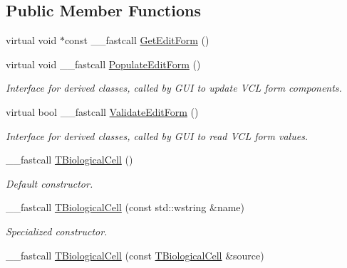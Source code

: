 \subsection*{Public Member Functions}
\begin{DoxyCompactItemize}
\item 
virtual void $\ast$const \+\_\+\+\_\+fastcall \hyperlink{class_t_biological_cell_a35a6350ccd6c518944f15902edc1c608}{Get\+Edit\+Form} ()
\item 
\hypertarget{class_t_biological_cell_a48bf395e0823aca37b48c5027cd525e2}{virtual void \+\_\+\+\_\+fastcall \hyperlink{class_t_biological_cell_a48bf395e0823aca37b48c5027cd525e2}{Populate\+Edit\+Form} ()}\label{class_t_biological_cell_a48bf395e0823aca37b48c5027cd525e2}

\begin{DoxyCompactList}\small\item\em Interface for derived classes, called by G\+U\+I to update V\+C\+L form components. \end{DoxyCompactList}\item 
\hypertarget{class_t_biological_cell_a5dcafb440645c90d2783e571dcdb06df}{virtual bool \+\_\+\+\_\+fastcall \hyperlink{class_t_biological_cell_a5dcafb440645c90d2783e571dcdb06df}{Validate\+Edit\+Form} ()}\label{class_t_biological_cell_a5dcafb440645c90d2783e571dcdb06df}

\begin{DoxyCompactList}\small\item\em Interface for derived classes, called by G\+U\+I to read V\+C\+L form values. \end{DoxyCompactList}\item 
\hypertarget{class_t_biological_cell_a8f09d1b52670bdff61c8beacb56ceacc}{\+\_\+\+\_\+fastcall \hyperlink{class_t_biological_cell_a8f09d1b52670bdff61c8beacb56ceacc}{T\+Biological\+Cell} ()}\label{class_t_biological_cell_a8f09d1b52670bdff61c8beacb56ceacc}

\begin{DoxyCompactList}\small\item\em Default constructor. \end{DoxyCompactList}\item 
\hypertarget{class_t_biological_cell_a53193dc5afdaa91fa5a51d5c1fefc579}{\+\_\+\+\_\+fastcall \hyperlink{class_t_biological_cell_a53193dc5afdaa91fa5a51d5c1fefc579}{T\+Biological\+Cell} (const std\+::wstring \&name)}\label{class_t_biological_cell_a53193dc5afdaa91fa5a51d5c1fefc579}

\begin{DoxyCompactList}\small\item\em Specialized constructor. \end{DoxyCompactList}\item 
\hypertarget{class_t_biological_cell_a84b78f66ee93ad556dfd08d3c6bb86ab}{\+\_\+\+\_\+fastcall \hyperlink{class_t_biological_cell_a84b78f66ee93ad556dfd08d3c6bb86ab}{T\+Biological\+Cell} (const \hyperlink{class_t_biological_cell}{T\+Biological\+Cell} \&source)}\label{class_t_biological_cell_a84b78f66ee93ad556dfd08d3c6bb86ab}


\end{DoxyCompactItemize}
